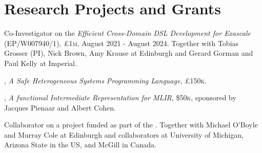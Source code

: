 \section{Research Projects and Grants}
\begin{cvitemize}
    \item Co-Investigator on the  \emph{Efficient Cross-Domain DSL Development for Exascale} (EP/W007940/1), £1\textsc{m}, August 2021 - August 2024.
    Together with Tobias Grosser (PI), Nick Brown, Amy Krause at Edinburgh and Gerard Gorman and Paul Kelly at Imperial.
\end{cvitemize}
\begin{cvitemize}
    \item {}, \textit{A Safe Heterogeneous Systems Programming Language}, £150\textsc{k}.%
\end{cvitemize}
\begin{cvitemize}
    \item {}, \textit{A functional Intermediate Representation for MLIR}, \$50\textsc{k}, sponsored by Jacques Pienaar and Albert Cohen.%
\end{cvitemize}
\begin{cvitemize}
    \item Collaborator on a project funded as part of the .
    Together with Michael O'Boyle and Murray Cole at Edinburgh and collaborators at University of Michigan, Arizona State in the US, and McGill in Canada.
\end{cvitemize}
